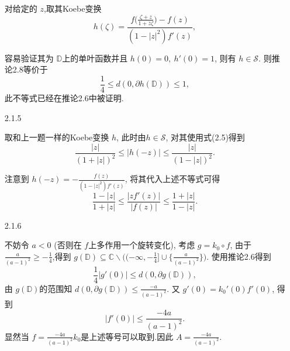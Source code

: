 \begin{itemize}
对给定的 $z$,取其Koebe变换
$$h(\zeta) = \frac{f\big(\frac{\zeta+z}{1+\overline{z}\zeta}\big)-f(z)}{(1-|z|^2)f'(z)},$$

容易验证其为 $\mathbb{D}$上的单叶函数并且 $h(0)=0,\ h'(0)=1$, 
则有 $h \in \mathcal{S}$. 则推论2.8等价于
$$\frac{1}{4}\le d(0,\partial h(\mathbb{D}))\le 1,$$
此不等式已经在推论2.6中被证明.


    \item[2.1.5]

取和上一题一样的Koebe变换 $h$, 此时由$h \in \mathcal{S}$, 对其使用式(2.5)得到
$$\frac{|z|}{(1+|z|)^2}\le |h(-z)|\le \frac{|z|}{(1-|z|)^2}.$$

注意到 $h(-z)= -\frac{f(z)}{(1-|z|^2)f'(z)}$, 将其代入上述不等式可得
 $$\frac{1-|z|}{1+|z|}\le \frac{|zf'(z)|}{|f(z)|}\le \frac{1+|z|}{1-|z|}.$$


    \item[2.1.6]

 不妨令 $a<0$ (否则在 $f$上多作用一个旋转变化), 考虑 $g = k_0\circ f$,
 由于 $\frac{a}{(a-1)^2}\ge -\frac{1}{4}$,得到
 $g(\mathbb{D}) \subseteq \mathbb{C}\backslash\big((-\infty,-\frac{1}{4}]\cup\{\frac{a}{(a-1)^2}\}\big)$. 
 使用推论2.6得到
 $$\frac{1}{4}|g'(0)|\le d(0,\partial g(\mathbb{D})),$$
 由 $g(\mathbb{D})$的范围知 $d(0,\partial g(\mathbb{D}))\le \frac{-a}{(a-1)^2}$.
 又 $g'(0) = k_0'(0)f'(0)$, 得到
 $$|f'(0)|\le  \frac{-4a}{(a-1)^2}.$$
 显然当 $f =\frac{-4a}{(a-1)^2}k_0 $是上述等号可以取到.因此 $A=\frac{-4a}{(a-1)^2}$.
\end{itemize} 

